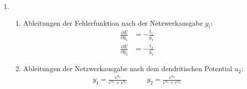 \documentclass{article}
\begin{document}
\begin{enumerate}
\begin{enumerate}[label=\alph*)]
        \end{enumerate}
  \item
        \begin{enumerate}[label= \alph*)]
          \item Ableitungen der Fehlerfunktion nach der Netzwerkausgabe $y_i$:\\
                \begin{align*}
                  \frac{\partial E}{\partial y_1} & = -\frac{t_1}{y_1} \\
                  \frac{\partial E}{\partial y_2} & = -\frac{t_2}{y_2}
                \end{align*}
          \item Ableitungen der Netzwerkausgabe nach dem dendritischen Potential $u_2$:
                \begin{align*}
                  y_1 = \frac{e^{u_1}}{e^{u_1} + e^{u_2}}\quad \quad & y_2 = \frac{e^{u_2}}{e^{u_1} + e^{u_2}}
                \end{align*}


\end{enumerate}
\end{enumerate}
\end{document}

